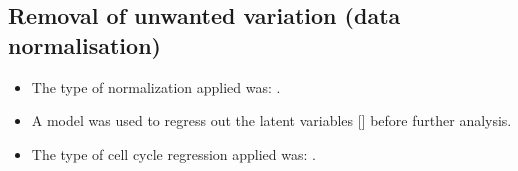 \subsection{Removal of unwanted variation (data normalisation)}

\begin{itemize}
\item The type of normalization applied was: \normalizationMethod.
\item A \modelType{} model was used to regress out the latent variables [\latentVariables] before further analysis.
\item The type of cell cycle regression applied was: \cellCycle.
\end{itemize}